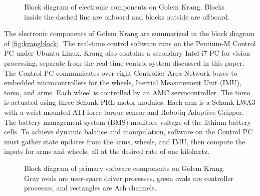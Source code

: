 \documentclass[letterpaper]{IEEEtran}
\begin{document}
\begin{figure}
  \caption{Block diagram of electronic components on Golem
    Krang. Blocks inside the dashed line are onboard and blocks
    outside are offboard.}
  \label{fig:krangblock}
\end{figure}

The electronic components of Golem Krang are summarized in the block
diagram of \autoref{fig:krangblock}.  The real-time control software
runs on the Pentium-M Control PC under Ubuntu Linux.  Krang also
contains a secondary Intel i7 PC for vision processing, separate from
the real-time control system discussed in this paper.  The Control PC
communicates over eight Controller Area Network buses to embedded
microcontrollers for the wheels, Inertial Measurement Unit (IMU),
torso, and arms.  Each wheel is controlled by an AMC servocontroller.
The torso is actuated using three Schunk PRL motor modules. Each arm
is a Schunk LWA3 with a wrist-mounted ATI force-torque sensor and
Robotiq Adaptive Gripper.  The battery management system (BMS)
monitors voltage of the lithium battery cells.  To achieve dynamic
balance and manipulation, software on the Control PC must gather state
updates from the arms, wheels, and IMU, then compute the inputs for
arms and wheels, all at the desired rate of one kilohertz.


\begin{figure}
  \begin{tikzpicture}[>=stealth,line
    join=bevel,scale=.122,every node/.style={scale=0.63}]
    
  \end{tikzpicture}
  \caption{Block diagram of primary software components on Golem
    Krang. Gray ovals are user-space driver processes, green ovals are
    controller processes, and rectangles are Ach channels.}
  \label{fig:krangsoft}
  \vspace{-2.0em}
\end{figure}
\end{document}
